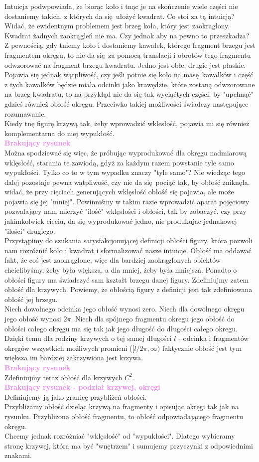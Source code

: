 \documentclass[a4paper, 12pt]{article}
\newcommand{\rysunek}[1]{\hfill \break\\[16pt] \Huge \textbf{\textcolor{violet}{Brakujący rysunek \normalsize
#1}} \hfill
\break \\[16pt] \normalsize}
\begin{document}
Intuicja podwpowiada, że biorąc koło i tnąc je na skończenie wiele części nie dostaniemy takich, z których
da się ułożyć kwadrat. Co stoi za tą intuicją? Widać, że ewidentnym problemem jest brzeg koła, który jest
zaokraglony. Kwadrat żadnych zaokrągleń nie ma. Czy jednak aby na pewno to przeszkadza? Z pewnością, gdy
tniemy koło i dostaniemy kawałek, którego fragment brzegu jest fragmentem okręgu, to nie da się za pomocą
translacji i obrotów tego fragmentu odwzorować na fragment brzegu kwadratu. Jedno jest obłe, drugie jest
płaskie. Pojawia się jednak wątpliwość, czy jeśli potnie się koło na masę kawałków i część z tych kawałków
będzie miała odcinki jako krawędzie, które zostaną odwzorowane na brzeg kwadratu, to na przykłąd nie da się
tak wyciąćtych części, by "upchnąć" gdzieś również obłość okręgu. Przeciwko takiej możliwości świadczy
następujące rozumawanie. \\
Kiedy tnę figurę krzywą tak, żeby wprowadzić wklesłość, pojawia mi się również komplementarna do niej
wypukłość.
\rysunek{}
Można spodziewać się więc, że próbując wyprodukować dla okręgu nadmiarową wklęsłość, starania te zawiodą,
gdyż za każdym razem powstanie tyle samo wypukłości. Tylko co to w tym wypadku znaczy "tyle samo"?
Nie wiedząc tego dalej pozostaje pewna wątpliwość, czy nie da się pociąć tak, by obłość zniknęła. widać, że
przy cięciach generujących wklęsłość obłość się pojawia, ale może pojawia się jej "mniej". Powinniśmy w takim
razie wprowadzić aparat pojęciowy pozwalający nam mierzyć "ilość" wklęsłości i obłości, tak by zobaczyć, czy
przy jakimkolwiek cięciu, da się wyprodukować jedno, nie produkujac jednakowej "ilości" drugiego. \\[4pt]
Przystąpimy do szukania satysfakcjonującej definicji obłości figury, która pozwoli nam rozróżnić
koło i kwadrat i sformalizować nasze intuicje. Obłość ma oddawać fakt, że coś jest zaokrąglone, więc dla bardziej
zaokrąglonych obiektów chcielibyśmy, żeby była większa, a dla mniej, żeby była mniejsza. Ponadto o obłości
figury ma świadczyć sam kształt brzegu danej figury. Zdefiniujmy zatem obłość dla krzywych. Powiemy, że
obłością figury z definicji jest tak zdefiniowana obłość jej brzegu. \\
Niech dowolnego odcinka jego obłość wynosi zero. Niech dla dowolnego okręgu jego obłość wynosi $2\pi$.
Niech dla spójnego fragmentu okregu jego obłość do obłości całego okręgu ma się tak jak jego długość do
długości całego okregu. Dzięki temu dla rodziny krzywych o tej samej długości $l$ - odcinka i fragmentów
okręgów wszystkich możliwych promieni ($[l/2\pi, \infty)$ faktycznie obłość jest tym większa im bardziej
zakrzywiona jest krzywa.
\rysunek{}
Zdefiniujmy teraz obłość dla krzywych $C^2$.
\rysunek{ - podział krzywej, okręgi }
Definiujemy ją jako granicę przybliżeń obłości. \\
Przybliżamy obłość dzieląc krzywą na fragmenty i opisując okręgi tak jak na rysunku. Przybliżona obłość
fragmentu, to obłość odpowiadającego fragmentu okręgu. \\
Chcemy jednak rozróżniać "wklęsłość" od "wypukłości". Dlatego wybieramy stronę krzywej, która ma być
"wnętrzem" i sumujemy przyczynki z odpowiednimi znakami. \\
\end{document}
